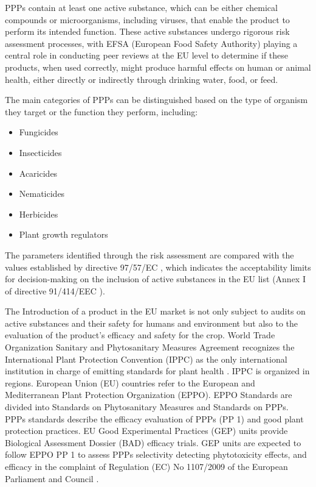 \documentclass[12pt,a4paper,oneside]{report}
\begin{document}
PPPs contain at least one active substance, which can be either 
chemical compounds or microorganisms, including viruses, that enable the product 
to perform its intended function. These active substances undergo rigorous risk 
assessment processes, with EFSA (European Food Safety Authority) playing a central 
role in conducting peer reviews at the EU level to determine if these products, 
when used correctly, might produce harmful effects on human or animal health, either 
directly or indirectly through drinking water, food, or feed.

The main categories of PPPs can be distinguished based on the 
type of organism they target or the function they perform, including:

\begin{itemize}
    \item Fungicides
    \item Insecticides
    \item Acaricides
    \item Nematicides
    \item Herbicides
    \item Plant growth regulators
\end{itemize}

The parameters identified through the risk assessment are compared with the values 
established by directive 97/57/EC \cite{EURLex1997265}, which indicates the acceptability limits for 
decision-making on the inclusion of active substances in the EU list (Annex I of 
directive 91/414/EEC \cite{directive_91_414_EEC}).

The Introduction of a product in the EU market is not only subject to audits on
active substances and their safety for humans and environment but also to the evaluation 
of the product's efficacy and safety for the crop.
World Trade Organization Sanitary and Phytosanitary Measures Agreement \cite{WTO_SPS_Agreement}
recognizes the International Plant Protection Convention (IPPC) as the only international
institution in charge of emitting standards for plant health \cite{IPPC}. IPPC is organized in
regions. European Union (EU) countries refer to the European and Mediterranean Plant
Protection Organization (EPPO). EPPO Standards are divided into Standards on
Phytosanitary Measures and Standards on PPPs. PPPs standards describe the efficacy
evaluation of PPPs (PP 1) and good plant protection practices. EU Good Experimental
Practices (GEP) units provide
Biological Assessment Dossier (BAD) efficacy trials. GEP units are expected to follow
EPPO PP 1 to assess PPPs selectivity detecting phytotoxicity effects, and efficacy in the
complaint of Regulation (EC) No 1107/2009 of the European Parliament and Council \cite{EC_Regulation_1107_2009}.
\end{document}

